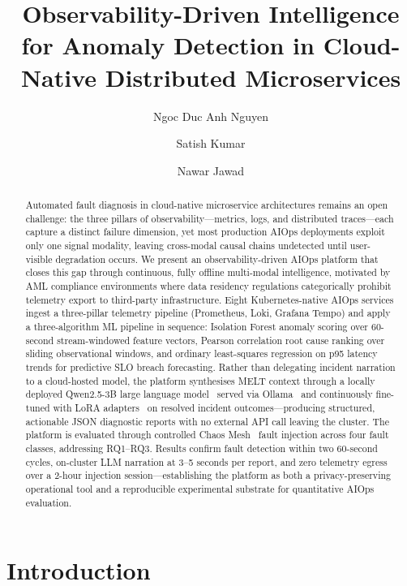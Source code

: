 \documentclass[a4paper]{lipics-v2021}
\title{Observability-Driven Intelligence for Anomaly Detection in
Cloud-Native Distributed Microservices}
\author{Ngoc Duc Anh Nguyen}
       {School of Built Environment, Engineering and Computing,
        Leeds Beckett University, Leeds, UK}
       {n.nguyen3896@leedsbeckett.ac.uk}
       {}{}
\author{Satish Kumar}
       {School of Built Environment, Engineering and Computing,
        Leeds Beckett University, Leeds, UK}
       {s.kumar@leedsbeckett.ac.uk}
       {}{}
\author{Nawar Jawad}
       {School of Built Environment, Engineering and Computing,
        Leeds Beckett University, Leeds, UK}
       {n.nawar@leedsbeckett.ac.uk}
       {}{}
\begin{document}
\maketitle
\begin{abstract}
Automated fault diagnosis in cloud-native microservice architectures remains an open
challenge: the three pillars of observability---metrics, logs, and distributed
traces---each capture a distinct failure dimension, yet most production AIOps
deployments exploit only one signal modality, leaving cross-modal causal chains
undetected until user-visible degradation occurs. We present an observability-driven
AIOps platform that closes this gap through continuous, fully offline multi-modal
intelligence, motivated by AML compliance environments where data residency
regulations categorically prohibit telemetry export to third-party infrastructure.
Eight Kubernetes-native AIOps services ingest a three-pillar telemetry pipeline
(Prometheus, Loki, Grafana Tempo) and apply a three-algorithm ML pipeline in
sequence: Isolation Forest anomaly scoring over 60-second stream-windowed feature
vectors, Pearson correlation root cause ranking over sliding observational windows,
and ordinary least-squares regression on p95 latency trends for predictive SLO breach
forecasting. Rather than delegating incident narration to a cloud-hosted model, the
platform synthesises MELT context through a locally deployed Qwen2.5-3B large
language model~\cite{qwen2024} served via Ollama~\cite{ollama2023} and
continuously fine-tuned with LoRA adapters~\cite{hu2022lora} on resolved incident
outcomes---producing structured, actionable JSON diagnostic reports with no external
API call leaving the cluster. The platform is evaluated through controlled Chaos Mesh~\cite{chaosmesh2020}
fault injection across four fault classes, addressing RQ1--RQ3. Results confirm
fault detection within two 60-second cycles, on-cluster LLM narration at 3--5
seconds per report, and zero telemetry egress over a 2-hour injection session---establishing the platform as both
a privacy-preserving operational tool and a reproducible experimental substrate for
quantitative AIOps evaluation.
\end{abstract}

\section{Introduction}
\label{sec:introduction}
\end{document}
